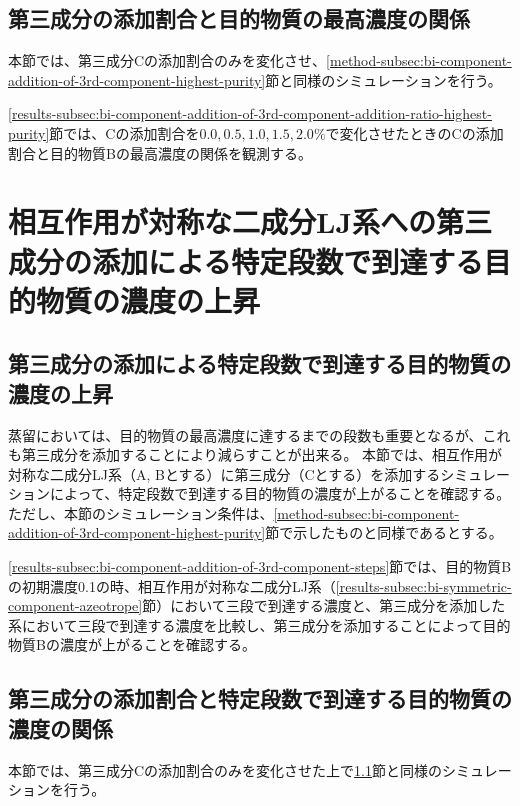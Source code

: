 \documentclass[titlepage]{jsreport}
\begin{document}
\subsection{第三成分の添加割合と目的物質の最高濃度の関係} \label{method-subsec:bi-component-addition-of-3rd-component-addition-ratio-highest-purity}
本節では、第三成分Cの添加割合のみを変化させ、\ref{method-subsec:bi-component-addition-of-3rd-component-highest-purity}節と同様のシミュレーションを行う。

\ref{results-subsec:bi-component-addition-of-3rd-component-addition-ratio-highest-purity}節では、Cの添加割合を$0.0,0.5,1.0,1.5,2.0\%$で変化させたときのCの添加割合と目的物質Bの最高濃度の関係を観測する。


\section{相互作用が対称な二成分LJ系への第三成分の添加による特定段数で到達する目的物質の濃度の上昇} \label{method-sec:bi-component-addition-of-3rd-component-steps}
\subsection{第三成分の添加による特定段数で到達する目的物質の濃度の上昇} \label{method-subsec:bi-component-addition-of-3rd-component-steps}
蒸留においては、目的物質の最高濃度に達するまでの段数も重要となるが、これも第三成分を添加することにより減らすことが出来る\cite{distillation}。
本節では、相互作用が対称な二成分LJ系（A, Bとする）に第三成分（Cとする）を添加するシミュレーションによって、特定段数で到達する目的物質の濃度が上がることを確認する。
ただし、本節のシミュレーション条件は、\ref{method-subsec:bi-component-addition-of-3rd-component-highest-purity}節で示したものと同様であるとする。

\ref{results-subsec:bi-component-addition-of-3rd-component-steps}節では、目的物質Bの初期濃度0.1の時、相互作用が対称な二成分LJ系（\ref{results-subsec:bi-symmetric-component-azeotrope}節）において三段で到達する濃度と、第三成分を添加した系において三段で到達する濃度を比較し、第三成分を添加することによって目的物質Bの濃度が上がることを確認する。


\subsection{第三成分の添加割合と特定段数で到達する目的物質の濃度の関係} \label{method-subsec:bi-component-addition-of-3rd-component-addition-ratio-steps}
本節では、第三成分Cの添加割合のみを変化させた上で\ref{method-subsec:bi-component-addition-of-3rd-component-steps}節と同様のシミュレーションを行う。
\end{document}
